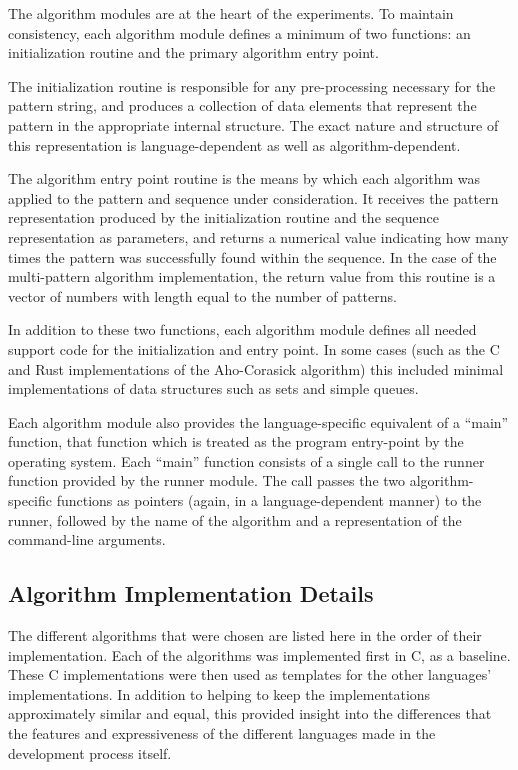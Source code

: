 The algorithm modules are at the heart of the experiments. To maintain consistency, each algorithm module defines a minimum of two functions: an initialization routine and the primary algorithm entry point.

The initialization routine is responsible for any pre-processing necessary for the pattern string, and produces a collection of data elements that represent the pattern in the appropriate internal structure. The exact nature and structure of this representation is language-dependent as well as algorithm-dependent.

The algorithm entry point routine is the means by which each algorithm was applied to the pattern and sequence under consideration. It receives the pattern representation produced by the initialization routine and the sequence representation as parameters, and returns a numerical value indicating how many times the pattern was successfully found within the sequence. In the case of the multi-pattern algorithm implementation, the return value from this routine is a vector of numbers with length equal to the number of patterns.

In addition to these two functions, each algorithm module defines all needed support code for the initialization and entry point. In some cases (such as the C and Rust implementations of the Aho-Corasick algorithm) this included minimal implementations of data structures such as sets and simple queues.

Each algorithm module also provides the language-specific equivalent of a ``main'' function, that function which is treated as the program entry-point by the operating system. Each ``main'' function consists of a single call to the runner function provided by the runner module. The call passes the two algorithm-specific functions as pointers (again, in a language-dependent manner) to the runner, followed by the name of the algorithm and a representation of the command-line arguments.

\subsection{Algorithm Implementation Details}

The different algorithms that were chosen are listed here in the order of their implementation. Each of the algorithms was implemented first in C, as a baseline. These C implementations were then used as templates for the other languages' implementations. In addition to helping to keep the implementations approximately similar and equal, this provided insight into the differences that the features and expressiveness of the different languages made in the development process itself.

